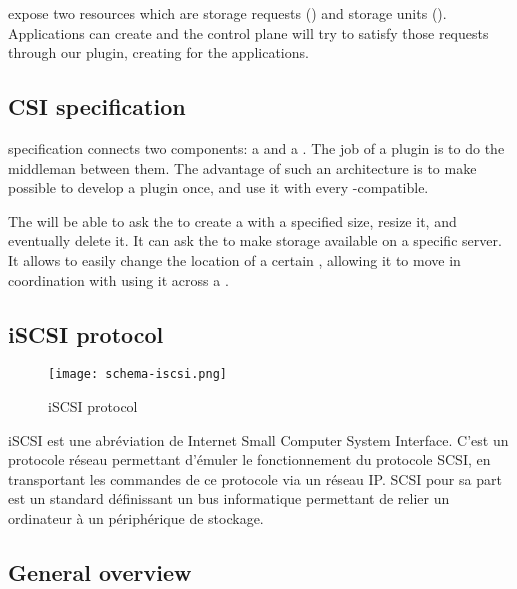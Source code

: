   expose two resources which are storage requests () and storage units (). Applications can create  and the  control plane will try to satisfy those requests through our  plugin, creating  for the applications.

\subsection{CSI specification}

 specification connects two components: a  and a . The job of a  plugin is to do the middleman between them. The advantage of such an architecture is to make possible to develop a plugin once, and use it with every  -compatible.

The  will be able to ask the  to create a  with a specified size, resize it, and eventually delete it. It can ask the  to make storage available on a specific server. It allows to easily change the location of a certain , allowing it to move in coordination with  using it across a .

\subsection{iSCSI protocol}

\begin{figure}[h]
    \centering
    \texttt{[image: schema-iscsi.png]}
    \caption{iSCSI protocol}
    \label{fig:icsci}
\end{figure}

\color{darkgreen}
iSCSI est une abréviation de Internet Small Computer System Interface. C'est un protocole réseau permettant d'émuler le fonctionnement du protocole SCSI, en transportant les commandes de ce protocole via un réseau IP. SCSI pour sa part est un standard définissant un bus informatique permettant de relier un ordinateur à un périphérique de stockage.
\color{black}

\subsection{General overview}

